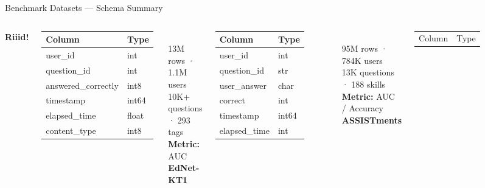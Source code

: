 \documentclass[aspectratio=169,12pt]{beamer}
\begin{document}
\begin{frame}{Benchmark Datasets — Schema Summary}
  \begin{columns}
      \textbf{Riiid!}\\[4pt]
      {\scriptsize\begin{tabular}{ll}
        \toprule
        Column & Type \\
        \midrule
        user\_id & int \\
        question\_id & int \\
        answered\_correctly & int8 \\
        timestamp & int64 \\
        elapsed\_time & float \\
        content\_type & int8 \\
        \bottomrule
      \end{tabular}}
      \vspace{4pt}\\
      \scriptsize 13M rows · 1.1M users\\
      10K+ questions · 293 tags\\
      \textbf{Metric:} AUC
      \textbf{EdNet-KT1}\\[4pt]
      {\scriptsize\begin{tabular}{ll}
        \toprule
        Column & Type \\
        \midrule
        user\_id & int \\
        question\_id & str \\
        user\_answer & char \\
        correct & int \\
        timestamp & int64 \\
        elapsed\_time & int \\
        \bottomrule
      \end{tabular}}
      \vspace{4pt}\\
      \scriptsize 95M rows · 784K users\\
      13K questions · 188 skills\\
      \textbf{Metric:} AUC / Accuracy
      \textbf{ASSISTments}\\[4pt]
      {\scriptsize\begin{tabular}{ll}
        \toprule
        Column & Type \\

\end{tabular}}
\end{columns}
\end{frame}
\end{document}
